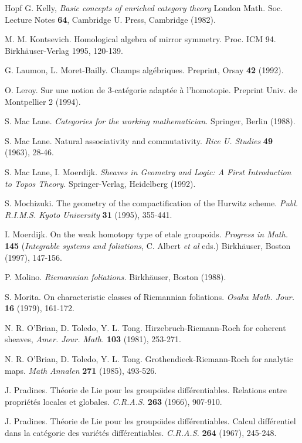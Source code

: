 \documentclass[12pt]{article}
\begin{document}
\begin{thebibliography}{Hopf}
G. Kelly, {\em Basic concepts of enriched category theory} London Math. Soc.
Lecture Notes {\bf 64}, Cambridge U. Press, Cambridge (1982).

M. M. Kontsevich. Homological algebra of mirror symmetry. Proc. ICM 94.
Birkh\"auser-Verlag 1995, 120-139.

G. Laumon, L. Moret-Bailly. Champs alg\'ebriques. Preprint, Orsay {\bf 42}
(1992).

O. Leroy.  Sur une notion de $3$-cat\'egorie adapt\'ee \`a l'homotopie.
Preprint Univ. de Montpellier 2 (1994).

S. Mac Lane. {\em Categories for the working mathematician.}
Springer, Berlin (1988).

S. Mac Lane. Natural associativity and commutativity. {\em Rice U. Studies}
{\bf 49} (1963), 28-46.

S. Mac Lane, I. Moerdijk. {\em Sheaves in Geometry and Logic: A First
Introduction to Topos Theory.} Springer-Verlag, Heidelberg (1992).

S. Mochizuki.  The geometry of the compactification  of the Hurwitz scheme.
{\em Publ. R.I.M.S. Kyoto University} {\bf 31} (1995), 355-441.

I. Moerdijk. On the weak homotopy type of etale groupoids. {\em Progress
in Math.} {\bf 145}
({\em Integrable systems and foliations}, C. Albert {\em et al} eds.)
Birkh\"auser, Boston (1997),
147-156.

P. Molino. {\em Riemannian foliations.} Birkh\"auser, Boston (1988).

S. Morita. On characteristic classes of Riemannian foliations. {\em
Osaka Math. Jour.} {\bf 16} (1979), 161-172.

N. R. O'Brian, D. Toledo, Y. L. Tong.  Hirzebruch-Riemann-Roch for
coherent sheaves, {\em Amer. Jour. Math.} {\bf  103} (1981),  253-271.

N. R. O'Brian, D. Toledo,  Y. L. Tong. Grothendieck-Riemann-Roch for
analytic maps.  {\em Math Annalen} {\bf  271} (1985), 493-526.

J. Pradines. Th\'eorie de Lie pour les groupo\"{\i}des
diff\'erentiables. Relations entre propri\'et\'es locales et globales.
{\em C.R.A.S.} {\bf 263} (1966), 907-910.

J. Pradines. Th\'eorie de Lie pour les groupo\"{\i}des
diff\'erentiables. Calcul diff\'erentiel dans la cat\'egorie des
vari\'et\'es diff\'erentiables. {\em C.R.A.S.} {\bf 264} (1967),
245-248.


\end{thebibliography}
\end{document}
